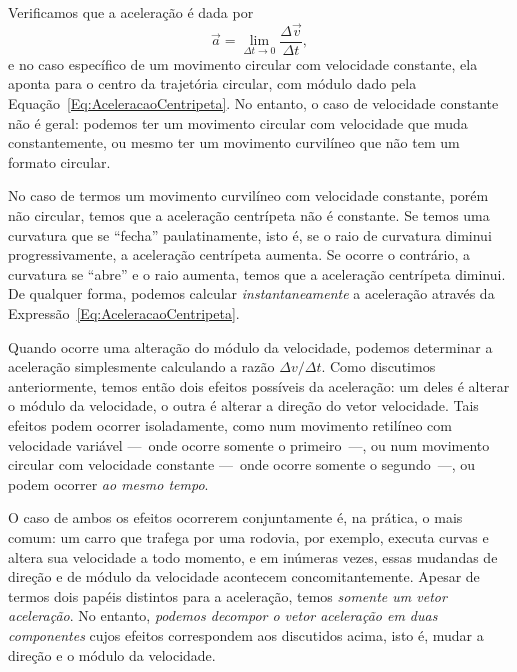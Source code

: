 Verificamos que a aceleração é dada por
\begin{displaymath}
  \vec{a} = \lim_{\Delta t \to 0} \frac{\Delta \vec{v}}{\Delta t},
\end{displaymath}
%
e no caso específico de um movimento circular com velocidade constante, ela aponta para o centro da trajetória circular, com módulo dado pela Equação~\eqref{Eq:AceleracaoCentripeta}. No entanto, o caso de velocidade constante não é geral: podemos ter um movimento circular com velocidade que muda constantemente, ou mesmo ter um movimento curvilíneo que não tem um formato circular.

No caso de termos um movimento curvilíneo com velocidade constante, porém não circular, temos que a aceleração centrípeta não é constante. Se temos uma curvatura que se ``fecha'' paulatinamente, isto é, se o raio de curvatura diminui progressivamente, a aceleração centrípeta aumenta. Se ocorre o contrário, a curvatura se ``abre'' e o raio aumenta, temos que a aceleração centrípeta diminui. De qualquer forma, podemos calcular \emph{instantaneamente} a aceleração através da Expressão~\ref{Eq:AceleracaoCentripeta}.

Quando ocorre uma alteração do módulo da velocidade, podemos determinar a aceleração simplesmente calculando a razão $\Delta v/\Delta t$. Como discutimos anteriormente, temos então dois efeitos possíveis da aceleração: um deles é alterar o módulo da velocidade, o outra é alterar a direção do vetor velocidade. Tais efeitos podem ocorrer isoladamente, como num movimento retilíneo com velocidade variável ---~onde ocorre somente o primeiro~---, ou num movimento circular com velocidade constante ---~onde ocorre somente o segundo~---, ou podem ocorrer \emph{ao mesmo tempo}.

O caso de ambos os efeitos ocorrerem conjuntamente é, na prática, o mais comum: um carro que trafega por uma rodovia, por exemplo, executa curvas e altera sua velocidade a todo momento, e em inúmeras vezes, essas mudandas de direção e de módulo da velocidade acontecem concomitantemente. Apesar de termos dois papéis distintos para a aceleração, temos \emph{somente um vetor aceleração}. No entanto, \emph{podemos decompor o vetor aceleração em duas componentes} cujos efeitos correspondem aos discutidos acima, isto é, mudar a direção e o módulo da velocidade. 


